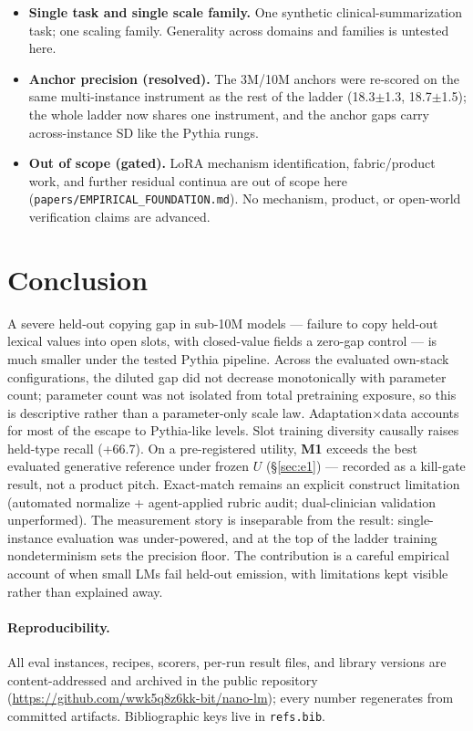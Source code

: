 \documentclass[11pt]{article}
\begin{document}
\begin{itemize}
\item
  \textbf{Single task and single scale family.} One synthetic clinical-summarization task; one scaling family. Generality across domains and families is untested here.
\item
  \textbf{Anchor precision (resolved).} The 3M/10M anchors were re-scored on the same multi-instance instrument as the rest of the ladder (18.3$\pm$1.3, 18.7$\pm$1.5); the whole ladder now shares one instrument, and the anchor gaps carry across-instance SD like the Pythia rungs.
\item
  \textbf{Out of scope (gated).} LoRA mechanism identification, fabric/product work, and further residual continua are out of scope here (\texttt{papers/EMPIRICAL\_FOUNDATION.md}). No mechanism, product, or open-world verification claims are advanced.
\end{itemize}

\section{Conclusion}\label{sec:conclusion}

A severe held-out copying gap in sub-10M models --- failure to copy held-out lexical values into open slots, with closed-value fields a zero-gap control --- is much smaller under the tested Pythia pipeline. Across the evaluated own-stack configurations, the diluted gap did not decrease monotonically with parameter count; parameter count was not isolated from total pretraining exposure, so this is descriptive rather than a parameter-only scale law. Adaptation$\times$data accounts for most of the escape to Pythia-like levels. Slot training diversity causally raises held-type recall (+66.7). On a pre-registered utility, \textbf{M1} exceeds the best evaluated generative reference under frozen $U$ (\S\ref{sec:e1}) --- recorded as a kill-gate result, not a product pitch. Exact-match remains an explicit construct limitation (automated normalize + agent-applied rubric audit; dual-clinician validation unperformed). The measurement story is inseparable from the result: single-instance evaluation was under-powered, and at the top of the ladder training nondeterminism sets the precision floor. The contribution is a careful empirical account of when small LMs fail held-out emission, with limitations kept visible rather than explained away.


\paragraph{Reproducibility.}
All eval instances, recipes, scorers, per-run result files, and library versions are
content-addressed and archived in the public repository
(\url{https://github.com/wwk5q8z6kk-bit/nano-lm}); every number regenerates from
committed artifacts. Bibliographic keys live in \texttt{refs.bib}.

\nocite{*}


\end{document}
